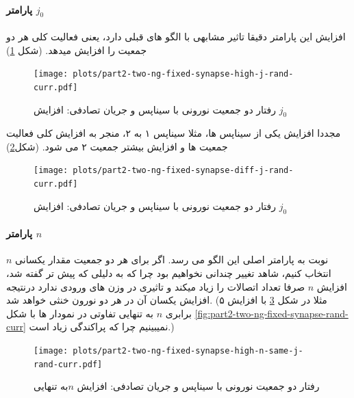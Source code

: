             \paragraph*{پارامتر $j_0$}
                افزایش این پارامتر دقیقا تاثیر مشابهی با الگو های قبلی دارد، یعنی فعالیت کلی هر دو جمعیت را افزایش میدهد.
                (شکل \ref{fig:part2-two-ng-fixed-synapse-high-j-rand-curr})
                \begin{figure}[!ht]
                    \centering
                    \texttt{[image: plots/part2-two-ng-fixed-synapse-high-j-rand-curr.pdf]} 
                    \caption{رفتار دو جمعیت نورونی با سیناپس و جریان تصادفی: افزایش $j_0$}
                    \label{fig:part2-two-ng-fixed-synapse-high-j-rand-curr}
                \end{figure}

                مجددا افزایش یکی از سیناپس ها، مثلا سیناپس ۱ به ۲، منجر به افزایش کلی فعالیت جمعیت ها و افزایش بیشتر جمعیت ۲ می شود.
                (شکل\ref{fig:part2-two-ng-fixed-synapse-diff-j-rand-curr})
                \begin{figure}[!ht]
                    \centering
                    \texttt{[image: plots/part2-two-ng-fixed-synapse-diff-j-rand-curr.pdf]} 
                    \caption{رفتار دو جمعیت نورونی با سیناپس و جریان تصادفی: افزایش $j_0$}
                    \label{fig:part2-two-ng-fixed-synapse-diff-j-rand-curr}
                \end{figure}

            \paragraph*{پارامتر $n$}
                نوبت به پارامتر اصلی این الگو می رسد. اگر برای هر دو جمعیت مقدار یکسانی 
                $n$ 
                انتخاب کنیم، شاهد تغییر چندانی نخواهیم بود چرا که به دلیلی که پیش تر گفته شد، افزایش 
                $n$ 
                صرفا تعداد اتصالات را زیاد میکند و تاثیری در وزن های ورودی ندارد درنتیجه افزایش یکسان آن در هر دو نورون خنثی خواهد شد.
                (مثلا در شکل
                \ref{fig:part2-two-ng-fixed-synapse-high-n-same-j-rand-curr}
                با افزایش ۵ برابری
                $n$ 
                به تنهایی تفاوتی در نمودار ها با شکل 
                \ref{fig:part2-two-ng-fixed-synapse-rand-curr}
                نمیبینیم چرا که پراکندگی زیاد است.)
                \begin{figure}[!ht]
                    \centering
                    \texttt{[image: plots/part2-two-ng-fixed-synapse-high-n-same-j-rand-curr.pdf]} 
                    \caption{رفتار دو جمعیت نورونی با سیناپس و جریان تصادفی: افزایش $n$به تنهایی}
                    \label{fig:part2-two-ng-fixed-synapse-high-n-same-j-rand-curr}
                \end{figure}

